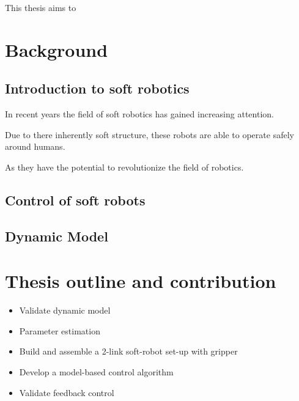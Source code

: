 This thesis aims to 

\section{Background}



\subsection{Introduction to soft robotics}

In recent years the field of soft robotics has gained increasing attention. 

Due to there inherently soft structure, these robots are able to operate safely around humans. 


As they have the potential to revolutionize the field of robotics.






\subsection{Control of soft robots}




\subsection{Dynamic Model}



\section{Thesis outline and contribution}




\begin{itemize}
    \item Validate dynamic model
    \item Parameter estimation
    \item Build and assemble a 2-link soft-robot set-up with gripper
    \item Develop a model-based control algorithm
    \item Validate feedback control
\end{itemize}